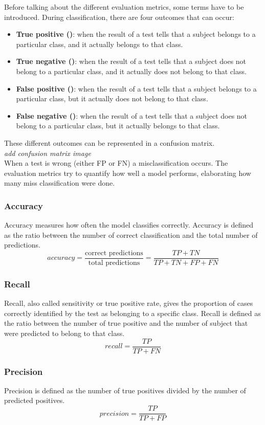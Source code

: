 Before talking about the different evaluation metrics, some terms have to be introduced. During classification, there are four outcomes that can occur:
\begin{itemize}
    \item \textbf{True positive ()}: when the result of a test tells that a subject belongs to a particular class, and it actually belongs to that class.
    \item \textbf{True negative ()}: when the result of a test tells that a subject does not belong to a particular class, and it actually does not belong to that class.
    \item \textbf{False positive ()}: when the result of a test tells that a subject belongs to a particular class, but it actually does not belong to that class.
    \item \textbf{False negative ()}: when the result of a test tells that a subject does not belong to a particular class, but it actually belongs to that class.
\end{itemize}
These different outcomes can be represented in a confusion matrix. \\

\emph{add confusion matrix image} \\

When a test is wrong (either \gls{FP} or \gls{FN}) a misclassification occurs. The evaluation metrics try to quantify how well a model performs, elaborating how many miss classification were done.

\subsubsection{Accuracy}
Accuracy measures how often the model classifies correctly. Accuracy is defined as the ratio between the number of correct classification and the total number of predictions.
\[
accuracy = \frac{\text{correct predictions}}{\text{total predictions}} = \frac{TP + TN}{TP + TN + FP + FN}
\]
\subsubsection{Recall}
Recall, also called sensitivity or true positive rate, gives the proportion of cases correctly identified by the test as belonging to a specific class. Recall is defined as the ratio between the number of true positive and the number of subject that were predicted to belong to that class.
\[
recall = \frac{TP}{TP + FN}
\]
\subsubsection{Precision}
Precision is defined as the number of true positives divided by the number of predicted positives.
\[
precision = \frac{TP}{TP + FP}
\]
